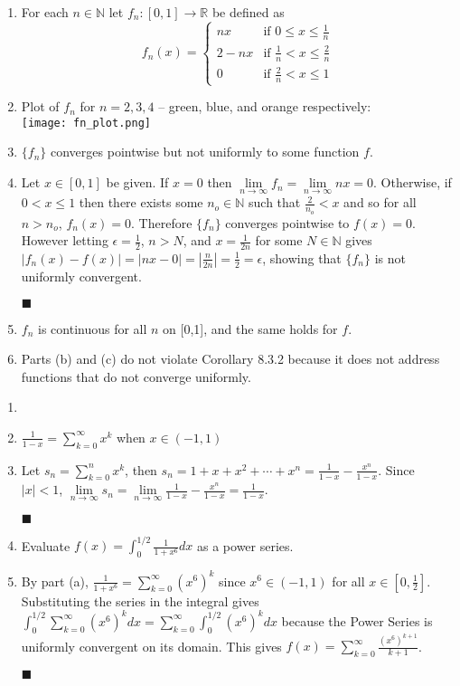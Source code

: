 \documentclass[a4paper,12pt]{report}
\newcommand{\bb}[1]{\mathbb{#1}}
\newcommand{\problem}[3]{
	\begin{enumerate}
		\item[\bf{Problem #1}] #2 
		#3
	\end{enumerate}
}
\newcommand{\subproof}[3]{
	\item[#1] #2
	\item[\bf{Proof:}] 
	#3 
	\begin{flushright}
		$\blacksquare$
	\end{flushright}
}
\begin{document}
\problem{4}{
	For each $n \in \bb{N}$ let $f_n : [0,1] \to \bb{R}$ be defined as \\
	\begin{displaymath}
		f_n(x) = \left\{
			\begin{array}{lr}
				nx & \text{if } 0 \leqslant x \leqslant \frac{1}{n} \\
				2 - nx & \text{if } \frac{1}{n} < x \leqslant \frac{2}{n} \\
				0 & \text{if } \frac{2}{n} < x \leqslant 1
			\end{array}
		\right.
	\end{displaymath}
}{
	\item[(a)] 
		Plot of $f_n$ for $n = 2, 3, 4$ -- green, blue, and orange respectively: \\
		\texttt{[image: fn\_plot.png]}
		
	\subproof{(b)}{
		$\{f_n\}$ converges pointwise but not uniformly to some function $f$.
	}{
		Let $x \in [0,1]$ be given. If $x = 0$ then $\lim\limits_{n \to \infty}f_n=\lim\limits_{n \to \infty}nx=0$. Otherwise, if $0 < x \leqslant 1$ then there exists some $n_o \in \bb{N}$ such that $\frac{2}{n_o} < x$ and so for all $n > n_o$, $f_n(x) = 0$. Therefore $\{f_n\}$ converges pointwise to $f(x)=0$. However letting $\epsilon = \frac{1}{2}$, $n>N$, and $x = \frac{1}{2n}$ for some $N \in \bb{N}$ gives $|f_n(x)-f(x)| = |nx-0| = \left|\frac{n}{2n}\right| = \frac{1}{2} = \epsilon$, showing that $\{f_n\}$ is not uniformly convergent.
	}
	
	\item[(c)] 
		$f_n$ is continuous for all $n$ on [0,1], and the same holds for $f$.
	
	\item[(d)] 
		Parts (b) and (c) do not violate Corollary 8.3.2 because it does not address functions that do not converge uniformly.
}

\pagebreak

\problem{5}{}{
	\subproof{(a)}{
		$\frac{1}{1-x} = \sum\limits_{k=0}^{\infty}x^k$ when $x \in (-1,1)$
	}{
		Let $s_n = \sum\limits_{k=0}^{n}x^k$, then $s_n = 1 + x + x^2 + \cdots + x^n = \frac{1}{1-x} - \frac{x^n}{1-x}$. Since $|x| < 1$, $\lim\limits_{n \to \infty}s_n = \lim\limits_{n \to \infty}\frac{1}{1-x} - \frac{x^n}{1-x} = \frac{1}{1-x}$.
	}
	
	\subproof{(b)}{
		Evaluate $f(x)=\int_{0}^{1/2}\frac{1}{1+x^6}dx$ as a power series.
	}{
		By part (a), $\frac{1}{1+x^6} = \sum\limits_{k=0}^{\infty}(x^6)^k$ since $x^6 \in (-1,1)$ for all $x \in \left[0,\frac{1}{2}\right]$. Substituting the series in the integral gives $\int_{0}^{1/2}\sum\limits_{k=0}^{\infty}(x^6)^k dx = \sum\limits_{k=0}^{\infty}\int_{0}^{1/2}(x^6)^k dx$ because the Power Series is uniformly convergent on its domain. This gives $f(x) = \sum\limits_{k=0}^{\infty}\frac{(x^6)^{k+1}}{k+1}$.
	}
}
\end{document}

